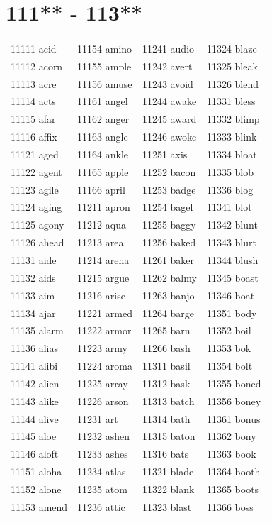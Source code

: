 \documentclass[10pt, oneside]{book}
\begin{document}
	\begin{table}
	\centering
	\section*{111** - 113**}
	\begin{tabular}{l l l l}
11111 acid &11154 amino &11241 audio &11324 blaze\\
11112 acorn &11155 ample &11242 avert &11325 bleak\\
11113 acre &11156 amuse &11243 avoid &11326 blend\\
11114 acts &11161 angel &11244 awake &11331 bless\\
11115 afar &11162 anger &11245 award &11332 blimp\\
11116 affix &11163 angle &11246 awoke &11333 blink\\
11121 aged &11164 ankle &11251 axis &11334 bloat\\
11122 agent &11165 apple &11252 bacon &11335 blob\\
11123 agile &11166 april &11253 badge &11336 blog\\
11124 aging &11211 apron &11254 bagel &11341 blot\\
11125 agony &11212 aqua &11255 baggy &11342 blunt\\
11126 ahead &11213 area &11256 baked &11343 blurt\\
11131 aide &11214 arena &11261 baker &11344 blush\\
11132 aids &11215 argue &11262 balmy &11345 boast\\
11133 aim &11216 arise &11263 banjo &11346 boat\\
11134 ajar &11221 armed &11264 barge &11351 body\\
11135 alarm &11222 armor &11265 barn &11352 boil\\
11136 alias &11223 army &11266 bash &11353 bok\\
11141 alibi &11224 aroma &11311 basil &11354 bolt\\
11142 alien &11225 array &11312 bask &11355 boned\\
11143 alike &11226 arson &11313 batch &11356 boney\\
11144 alive &11231 art &11314 bath &11361 bonus\\
11145 aloe &11232 ashen &11315 baton &11362 bony\\
11146 aloft &11233 ashes &11316 bats &11363 book\\
11151 aloha &11234 atlas &11321 blade &11364 booth\\
11152 alone &11235 atom &11322 blank &11365 boots\\
11153 amend &11236 attic &11323 blast &11366 boss\\
	\end{tabular}
 \end{table}
\clearpage
\end{document}

